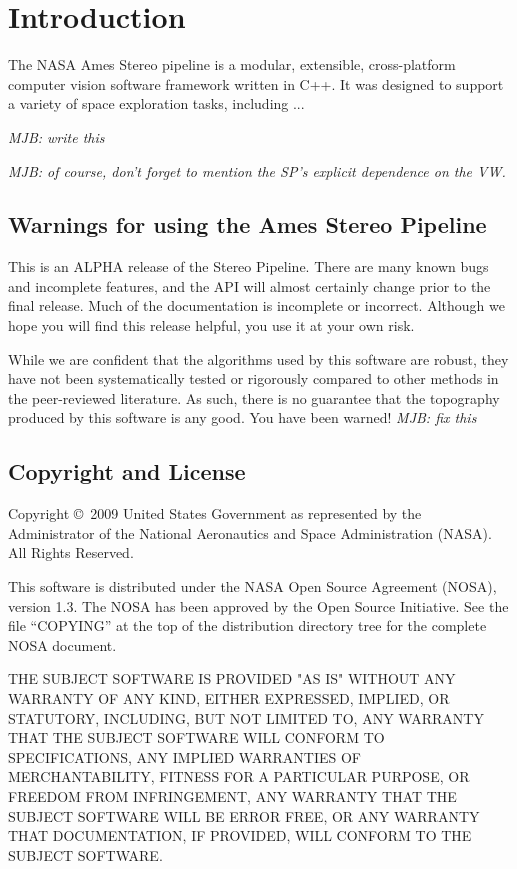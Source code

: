 \chapter{Introduction}

The NASA Ames Stereo pipeline is a modular, extensible, cross-platform
computer vision software framework written in C++.  It was designed to
support a variety of space exploration tasks, including ...

\emph{MJB: write this}

\emph{MJB: of course, don't forget to mention the SP's explicit dependence on the VW.}


\section{Warnings for using the Ames Stereo Pipeline}

This is an ALPHA release of the Stereo Pipeline.  There are many
known bugs and incomplete features, and the API will almost certainly
change prior to the final release.  Much of the documentation is
incomplete or incorrect.  Although we hope you will find this release
helpful, you use it at your own risk.

While we are confident that the algorithms used by this software
are robust, they have not been systematically tested or rigorously
compared to other methods in the peer-reviewed literature.  As such,
there is no guarantee that the topography produced by this software 
is any good.  You have been warned! \emph{MJB: fix this}

\section{Copyright and License}

Copyright \copyright\ 2009 United States Government as represented by the
Administrator of the National Aeronautics and Space Administration
(NASA).  All Rights Reserved.

This software is distributed under the NASA Open Source Agreement
(NOSA), version 1.3.  The NOSA has been approved by the Open Source
Initiative.  See the file ``COPYING'' at the top of the distribution
directory tree for the complete NOSA document.

THE SUBJECT SOFTWARE IS PROVIDED "AS IS" WITHOUT ANY WARRANTY OF ANY
KIND, EITHER EXPRESSED, IMPLIED, OR STATUTORY, INCLUDING, BUT NOT
LIMITED TO, ANY WARRANTY THAT THE SUBJECT SOFTWARE WILL CONFORM TO
SPECIFICATIONS, ANY IMPLIED WARRANTIES OF MERCHANTABILITY, FITNESS FOR
A PARTICULAR PURPOSE, OR FREEDOM FROM INFRINGEMENT, ANY WARRANTY THAT
THE SUBJECT SOFTWARE WILL BE ERROR FREE, OR ANY WARRANTY THAT
DOCUMENTATION, IF PROVIDED, WILL CONFORM TO THE SUBJECT SOFTWARE.

